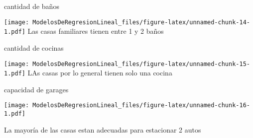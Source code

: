 \documentclass[
]{article}
\newenvironment{Shaded}{\begin{snugshade}}{\end{snugshade}}
\newcommand{\FunctionTok}[1]{\textcolor[rgb]{0.00,0.00,0.00}{#1}}
\newcommand{\NormalTok}[1]{#1}
\newcommand{\OtherTok}[1]{\textcolor[rgb]{0.56,0.35,0.01}{#1}}
\newcommand{\SpecialCharTok}[1]{\textcolor[rgb]{0.00,0.00,0.00}{#1}}
\newcommand{\StringTok}[1]{\textcolor[rgb]{0.31,0.60,0.02}{#1}}
\begin{document}
cantidad de baños

\begin{Shaded}
\end{Shaded}

\texttt{[image: ModelosDeRegresionLineal\_files/figure-latex/unnamed-chunk-14-1.pdf]}
Las casas familiares tienen entre 1 y 2 baños

cantidad de cocinas

\begin{Shaded}
\end{Shaded}

\texttt{[image: ModelosDeRegresionLineal\_files/figure-latex/unnamed-chunk-15-1.pdf]}
LAs casas por lo general tienen solo una cocina

capacidad de garages

\begin{Shaded}
\end{Shaded}

\texttt{[image: ModelosDeRegresionLineal\_files/figure-latex/unnamed-chunk-16-1.pdf]}

La mayoría de las casas estan adecuadas para estacionar 2 autos
\end{document}
